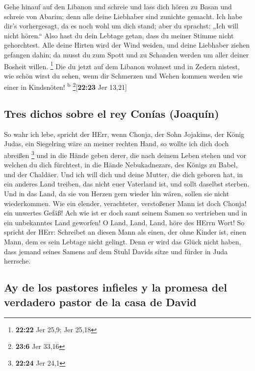  Gehe hinauf auf den Libanon und schreie und lass dich
hören zu Basan und schreie von Abarim; denn alle deine Liebhaber sind
zunichte gemacht.  Ich habe dir's vorhergesagt, da es
noch wohl um dich stand; aber du sprachst: „Ich will nicht hören.`` Also
hast du dein Lebtage getan, dass du meiner Stimme nicht gehorchtest.
 Alle deine Hirten wird der Wind weiden, und deine
Liebhaber ziehen gefangen dahin; da musst du zum Spott und zu Schanden
werden um aller deiner Bosheit willen. \footnote{\textbf{22:22} Jer
  25,9; Jer 25,18}  Die du jetzt auf dem Libanon wohnest
und in Zedern nistest, wie schön wirst du sehen, wenn dir Schmerzen und
Wehen kommen werden wie einer in Kindsnöten! \textsuperscript{b}
\footnote{\textbf{23:6} Jer 33,16}{[}\textbf{22:23} Jer 13,21{]}

\hypertarget{tres-dichos-sobre-el-rey-conuxedas-joaquuxedn}{%
\subsection{Tres dichos sobre el rey Conías
(Joaquín)}\label{tres-dichos-sobre-el-rey-conuxedas-joaquuxedn}}

 So wahr ich lebe, spricht der HErr, wenn Chonja, der
Sohn Jojakims, der König Judas, ein Siegelring wäre an meiner rechten
Hand, so wollte ich dich doch abreißen \footnote{\textbf{22:24} Jer 24,1}
 und in die Hände geben derer, die nach deinem Leben
stehen und vor welchen du dich fürchtest, in die Hände Nebukadnezars,
des Königs zu Babel, und der Chaldäer.  Und ich will dich
und deine Mutter, die dich geboren hat, in ein anderes Land treiben, das
nicht euer Vaterland ist, und sollt daselbst sterben. 
Und in das Land, da sie von Herzen gern wieder hin wären, sollen sie
nicht wiederkommen.  Wie ein elender, verachteter,
verstoßener Mann ist doch Chonja! ein unwertes Gefäß! Ach wie ist er
doch samt seinem Samen so vertrieben und in ein unbekanntes Land
geworfen!  O Land, Land, Land, höre des HErrn Wort!
 So spricht der HErr: Schreibet an diesen Mann als einen,
der ohne Kinder ist, einen Mann, dem es sein Lebtage nicht gelingt. Denn
er wird das Glück nicht haben, dass jemand seines Samens auf dem Stuhl
Davids sitze und fürder in Juda herrsche.

\hypertarget{ay-de-los-pastores-infieles-y-la-promesa-del-verdadero-pastor-de-la-casa-de-david}{%
\subsection{Ay de los pastores infieles y la promesa del verdadero
pastor de la casa de
David}\label{ay-de-los-pastores-infieles-y-la-promesa-del-verdadero-pastor-de-la-casa-de-david}}

